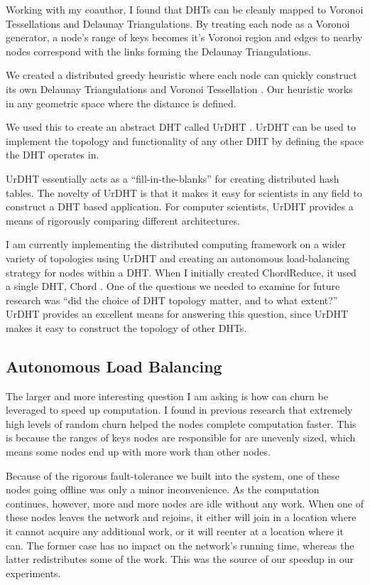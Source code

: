 \documentclass[letterpaper]{article}
\begin{document}
Working with my coauthor, I found that DHTs can be cleanly mapped to Voronoi Tessellations and Delaunay Triangulations.
By treating each node as a Voronoi generator, a node's range of keys becomes it's Voronoi region and edges to nearby nodes correspond with the links forming the Delaunay Triangulations.

We created a distributed greedy heuristic where each node can quickly construct its own Delaunay Triangulations and  Voronoi Tessellation \cite{dgvh}.
Our heuristic works in any geometric space where the distance is defined.

We used this to create an abstract DHT called UrDHT \cite{urdht}.
UrDHT can be used to implement the topology and functionality  of any other DHT by defining the space the DHT operates in.

UrDHT essentially acts as a ``fill-in-the-blanks'' for creating  distributed hash tables.
The novelty of UrDHT is that it makes it easy for scientists in any field to construct a DHT based application.
For computer scientists, UrDHT provides a means of rigorously comparing different architectures.

I am currently implementing the distributed computing framework on a wider variety of topologies using UrDHT and creating an autonomous load-balancing strategy for nodes within a DHT.
When I initially created ChordReduce, it used a single DHT, Chord \cite{chord}.
One of the questions we needed to examine for future research was ``did the choice of DHT topology matter, and to what extent?''
UrDHT provides an excellent means for answering this question, since  UrDHT makes it easy to construct the topology of other DHTs.


\subsection{Autonomous Load Balancing}
The larger and more interesting question I am asking is how can churn be leveraged to speed up computation.
I found in previous research that extremely high levels of random churn helped the nodes complete computation faster.
This is because the ranges of keys nodes are responsible for are unevenly sized, which means some nodes end up with more work than other nodes.

Because of the rigorous fault-tolerance we built into the system, one of these nodes going offline was only a minor inconvenience.
As the computation continues, however, more and more nodes are idle without any work.
When one of these nodes leaves the network and rejoins, it either will join in a location where it cannot acquire any additional work, or it will reenter at a location where it can.
The former case has no impact on the network's running time, whereas the latter redistributes some of the work.
This was the source of our speedup in our experiments.
\end{document}

